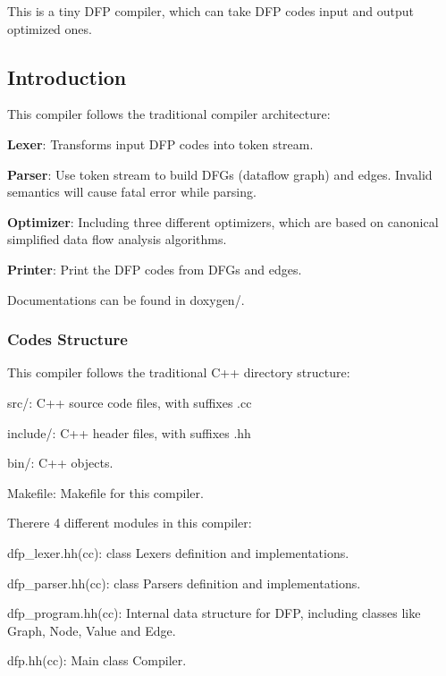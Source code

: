 This is a tiny D\+FP compiler, which can take D\+FP codes input and output optimized ones.

\subsection*{Introduction}

This compiler follows the traditional compiler architecture\+:


\begin{DoxyItemize}
\item {\bfseries Lexer}\+: Transforms input D\+FP codes into token stream.
\item {\bfseries Parser}\+: Use token stream to build D\+F\+Gs (dataflow graph) and edges. Invalid semantics will cause fatal error while parsing.
\item {\bfseries Optimizer}\+: Including three different optimizers, which are based on canonical simplified data flow analysis algorithms.
\item {\bfseries Printer}\+: Print the D\+FP codes from D\+F\+Gs and edges.
\end{DoxyItemize}

Documentations can be found in {\ttfamily doxygen/}.

\subsubsection*{Codes Structure}

This compiler follows the traditional C++ directory structure\+:


\begin{DoxyEnumerate}
\item {\ttfamily src/}\+: C++ source code files, with suffixes {\ttfamily .cc}
\item {\ttfamily include/}\+: C++ header files, with suffixes {\ttfamily .hh}
\item {\ttfamily bin/}\+: C++ objects.
\item {\ttfamily Makefile}\+: Makefile for this compiler.
\end{DoxyEnumerate}

There\textquotesingle{}re 4 different modules in this compiler\+:


\begin{DoxyEnumerate}
\item {\ttfamily dfp\+\_\+lexer.\+hh(cc)}\+: {\ttfamily class Lexer}\textquotesingle{}s definition and implementations.
\item {\ttfamily dfp\+\_\+parser.\+hh(cc)}\+: {\ttfamily class Parser}\textquotesingle{}s definition and implementations.
\item {\ttfamily dfp\+\_\+program.\+hh(cc)}\+: Internal data structure for D\+FP, including classes like {\ttfamily Graph}, {\ttfamily Node}, {\ttfamily Value} and {\ttfamily Edge}.
\item {\ttfamily dfp.\+hh(cc)}\+: Main class {\ttfamily Compiler}.
\end{DoxyEnumerate}


